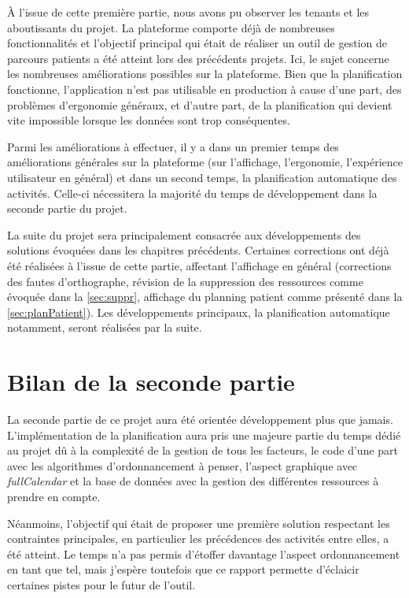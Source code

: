 \documentclass[noposter]{polytech/polytech}
\begin{document}
À l'issue de cette première partie, nous avons pu observer les tenants et les aboutissants du projet. La plateforme comporte déjà de nombreuses fonctionnalités et l'objectif principal qui était de réaliser un outil de gestion de parcours patients a été atteint lors des précédents projets. Ici, le sujet concerne les nombreuses améliorations possibles sur la plateforme. Bien que la planification fonctionne, l'application n'est pas utilisable en production à cause d'une part, des problèmes d'ergonomie généraux, et d'autre part, de la planification qui devient vite impossible lorsque les données sont trop conséquentes.

Parmi les améliorations à effectuer, il y a dans un premier temps des améliorations générales sur la plateforme (sur l'affichage, l'ergonomie, l'expérience utilisateur en général) et dans un second temps, la planification automatique des activités. Celle-ci nécessitera la majorité du temps de développement dans la seconde partie du projet.

La suite du projet sera principalement consacrée aux développements des solutions évoquées dans les chapitres précédents. Certaines corrections ont déjà été réalisées à l'issue de cette partie, affectant l'affichage en général (corrections des fautes d'orthographe, révision de la suppression des ressources comme évoquée dans la \autoref{sec:suppr}, affichage du planning patient comme présenté dans la \autoref{sec:planPatient}). Les développements principaux, la planification automatique notamment, seront réalisées par la suite. 


\section*{Bilan de la seconde partie}

La seconde partie de ce projet aura été orientée développement plus que jamais. L'implémentation de la planification aura pris une majeure partie du temps dédié au projet dû à la complexité de la gestion de tous les facteurs, le code d'une part avec les algorithmes d'ordonnancement à penser, l'aspect graphique avec \textit{fullCalendar} et la base de données avec la gestion des différentes ressources à prendre en compte. 

Néanmoins, l'objectif qui était de proposer une première solution respectant les contraintes principales, en particulier les précédences des activités entre elles, a été atteint. Le temps n'a pas permis d'étoffer davantage l'aspect ordonnancement en tant que tel, mais j'espère toutefois que ce rapport permette d'éclaicir certaines pistes pour le futur de l'outil.
\end{document}
